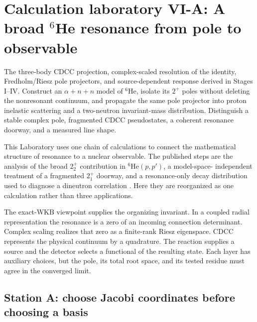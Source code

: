 \section{Calculation laboratory VI-A: A broad
\texorpdfstring{$^6$He}{6He} resonance from pole to observable}
\label{lab:helium6-resonance}

\calculationroute
  {The three-body CDCC projection, complex-scaled resolution of the identity,
  Fredholm/Riesz pole projectors, and source-dependent response derived in
  Stages I--IV.}
  {Construct an $\alpha+n+n$ model of $^6$He, isolate its $2^+$ poles without
  deleting the nonresonant continuum, and propagate the same pole projector
  into proton inelastic scattering and a two-neutron invariant-mass
  distribution.}
  {Distinguish a stable complex pole, fragmented CDCC pseudostates, a coherent
  resonance doorway, and a measured line shape.}

This Laboratory uses one chain of calculations to connect the mathematical
structure of resonance to a nuclear observable.  The published steps are the
analysis of the broad $2_2^+$ contribution in $^6$He$(p,p')$, a model-space-
independent treatment of a fragmented $2_1^+$ doorway, and a resonance-only
decay distribution used to diagnose a dineutron correlation
\cite{arXiv:2003.05123,arXiv:2103.16865,arXiv:2111.04285,
OgawaThesis:2022}.  Here they are reorganized as one calculation rather than
three applications.

The exact-WKB viewpoint supplies the organizing invariant.  In a coupled
radial representation the resonance is a zero of an incoming connection
determinant.  Complex scaling realizes that zero as a finite-rank Riesz
eigenspace.  CDCC represents the physical continuum by a quadrature.  The
reaction supplies a source and the detector selects a functional of the
resulting state.  Each layer has auxiliary choices, but the pole, its total
root space, and its tested residue must agree in the converged limit.

\subsection{Station A: choose Jacobi coordinates before choosing a basis}
\label{subsec:he6-jacobi}

